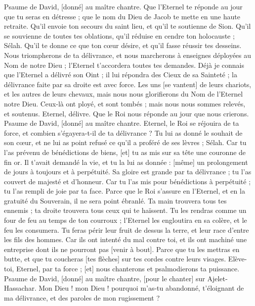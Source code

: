 \begin{multicols}{2}
\VerseOne{}Psaume de David, [donné] au maître chantre. Que l'Eternel te réponde au jour que tu seras en détresse ; que le nom du Dieu de Jacob te mette en une haute retraite.
Qu'il envoie ton secours du saint lieu, et qu'il te soutienne de Sion.
Qu'il se souvienne de toutes tes oblations, qu'il réduise en cendre ton holocauste ; Sélah.
Qu'il te donne ce que ton cœur désire, et qu'il fasse réussir tes desseins.
Nous triompherons de ta délivrance, et nous marcherons à enseignes déployées au Nom de notre Dieu ; l'Eternel t'accordera toutes tes demandes.
Déjà je connais que l'Eternel a délivré son Oint ; il lui répondra des Cieux de sa Sainteté ; la délivrance faite par sa droite est avec force.
Les uns [se vantent] de leurs chariots, et les autres de leurs chevaux, mais nous nous glorifierons du Nom de l'Eternel notre Dieu.
Ceux-là ont ployé, et sont tombés ; mais nous nous sommes relevés, et soutenus.
Eternel, délivre. Que le Roi nous réponde au jour que nous crierons.
\VerseOne{}Psaume de David, [donné] au maître chantre. Eternel, le Roi se réjouira de ta force, et combien s'égayera-t-il de ta délivrance ?
Tu lui as donné le souhait de son cœur, et ne lui as point refusé ce qu'il a proféré de ses lèvres ; Sélah.
Car tu l'as prévenu de bénédictions de biens, [et] tu as mis sur sa tête une couronne de fin or.
Il t'avait demandé la vie, et tu la lui as donnée : [même] un prolongement de jours à toujours et à perpétuité.
Sa gloire est grande par ta délivrance ; tu l'as couvert de majesté et d'honneur.
Car tu l'as mis pour bénédictions à perpétuité ; tu l'as rempli de joie par ta face.
Parce que le Roi s'assure en l'Eternel, et en la gratuité du Souverain, il ne sera point ébranlé.
Ta main trouvera tous tes ennemis ; ta droite trouvera tous ceux qui te haïssent.
Tu les rendras comme un four de feu au temps de ton courroux ; l'Eternel les engloutira en sa colère, et le feu les consumera.
Tu feras périr leur fruit de dessus la terre, et leur race d'entre les fils des hommes.
Car ils ont intenté du mal contre toi, et ils ont machiné une entreprise dont ils ne pourront pas [venir à bout].
Parce que tu les mettras en butte, et que tu coucheras [tes flèches] sur tes cordes contre leurs visages.
Elève-toi, Eternel, par ta force ; [et] nous chanterons et psalmodierons ta puissance.
\VerseOne{}Psaume de David, [donné] au maître chantre, [pour le chanter] sur Ajelet-Hassachar. Mon Dieu ! mon Dieu ! pourquoi m'as-tu abandonné, t'éloignant de ma délivrance, et des paroles de mon rugissement ?

\end{multicols}
